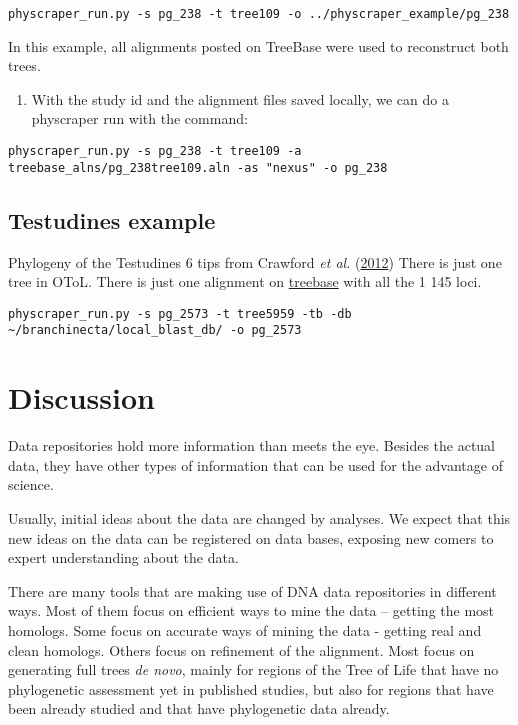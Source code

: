 \documentclass[]{article}
\providecommand{\tightlist}{%
  \setlength{\itemsep}{0pt}\setlength{\parskip}{0pt}}
\begin{document}
\begin{verbatim}
physcraper_run.py -s pg_238 -t tree109 -o ../physcraper_example/pg_238
\end{verbatim}

In this example, all alignments posted on TreeBase were used to reconstruct both trees.

\begin{enumerate}
\def\labelenumi{\arabic{enumi}.}
\tightlist
\item
  With the study id and the alignment files saved locally, we can do a physcraper run with the command:
\end{enumerate}

\begin{verbatim}
physcraper_run.py -s pg_238 -t tree109 -a treebase_alns/pg_238tree109.aln -as "nexus" -o pg_238
\end{verbatim}

\hypertarget{testudines-example}{%
\subsection{Testudines example}\label{testudines-example}}

Phylogeny of the Testudines 6 tips from Crawford \emph{et al.} (\protect\hyperlink{ref-crawford2012more}{2012})
There is just one tree in OToL.
There is just one alignment on \href{https://treebase.org/treebase-web/search/study/matrices.html?id=12742}{treebase} with all the 1 145 loci.

\begin{verbatim}
physcraper_run.py -s pg_2573 -t tree5959 -tb -db ~/branchinecta/local_blast_db/ -o pg_2573
\end{verbatim}

\hypertarget{discussion}{%
\section{Discussion}\label{discussion}}

Data repositories hold more information than meets the eye.
Besides the actual data, they have other types of information that can be used for the advantage of science.

Usually, initial ideas about the data are changed by analyses.
We expect that this new ideas on the data can be registered on data bases,
exposing new comers to expert understanding about the data.

There are many tools that are making use of DNA data repositories in different ways.
Most of them focus on efficient ways to mine the data -- getting the most homologs.
Some focus on accurate ways of mining the data - getting real and clean homologs.
Others focus on refinement of the alignment.
Most focus on generating full trees \emph{de novo}, mainly for regions of the Tree of
Life that have no phylogenetic assessment yet in published studies, but also for
regions that have been already studied and that have phylogenetic data already.
\end{document}
